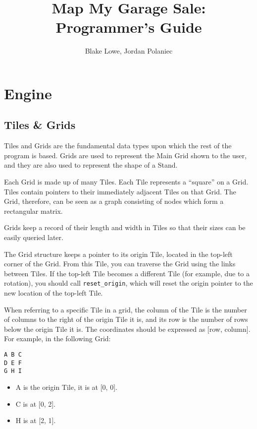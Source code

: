 \documentclass{report}
\title{Map My Garage Sale: Programmer's Guide}
\author{Blake Lowe, Jordan Polaniec}
\begin{document}
\maketitle
\newpage
{}

\tableofcontents
\newpage

\chapter{Engine}

\section{Tiles \& Grids}
Tiles and Grids are the fundamental data types upon which the rest of the
program is based. Grids are used to represent the Main Grid shown to the user,
and they are also used to represent the shape of a Stand.

Each Grid is made up of many Tiles. Each Tile represents a ``square'' on a
Grid. Tiles contain pointers to their immediately adjacent Tiles on that Grid.
The Grid, therefore, can be seen as a graph consisting of nodes which form
a rectangular matrix.

Grids keep a record of their length and width in Tiles so that their
sizes can be easily queried later.

The Grid structure keeps a pointer to its origin Tile, located in the
top-left corner of the Grid. From this Tile, you can traverse the Grid
using the links between Tiles. If the top-left Tile becomes a different Tile
(for example, due to a rotation), you should call \texttt{reset_origin}, which will
reset the origin pointer to the new location of the top-left Tile.

When referring to a specific Tile in a grid, the column of the Tile
is the number of columns to the right of the origin Tile it is, and
its row is the number of rows below the origin Tile it is.
The coordinates should be expressed as [row, column].
For example, in the following Grid:
\begin{verbatim}
A B C
D E F
G H I
\end{verbatim}
\begin{itemize}
	\item A is the origin Tile, it is at [0, 0].
	\item C is at [0, 2].
	\item H is at [2, 1].
\end{itemize}
\end{document}
